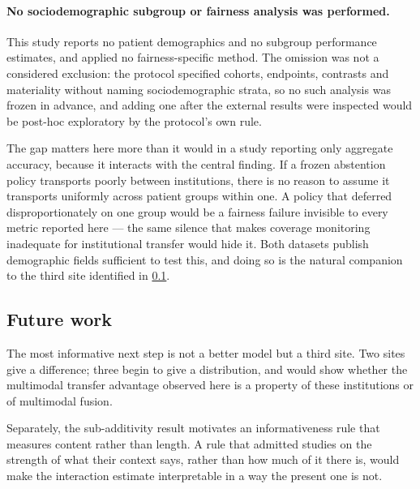\paragraph{No sociodemographic subgroup or fairness analysis was performed.}
This study reports no patient demographics and no subgroup performance
estimates, and applied no fairness-specific method. The omission was not a
considered exclusion: the protocol specified cohorts, endpoints, contrasts and
materiality without naming sociodemographic strata, so no such analysis was
frozen in advance, and adding one after the external results were inspected
would be post-hoc exploratory by the protocol's own rule.

The gap matters here more than it would in a study reporting only aggregate
accuracy, because it interacts with the central finding. If a frozen abstention
policy transports poorly between institutions, there is no reason to assume it
transports uniformly across patient groups within one. A policy that deferred
disproportionately on one group would be a fairness failure invisible to every
metric reported here --- the same silence that makes coverage monitoring
inadequate for institutional transfer would hide it. Both datasets publish
demographic fields sufficient to test this, and doing so is the natural
companion to the third site identified in \cref{sec:future-work}.

\subsection{Future work}
\label{sec:future-work}

The most informative next step is not a better model but a third site. Two sites
give a difference; three begin to give a distribution, and would show whether
the multimodal transfer advantage observed here is a property of these
institutions or of multimodal fusion.

Separately, the sub-additivity result motivates an informativeness rule that
measures content rather than length. A rule that admitted studies on the
strength of what their context says, rather than how much of it there is, would
make the interaction estimate interpretable in a way the present one is not.
